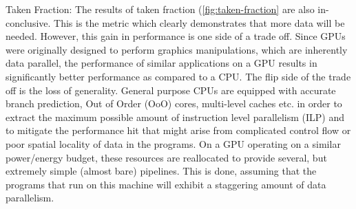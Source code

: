 \par{Taken Fraction: The results of taken fraction (\ref{fig:taken-fraction} are also in-conclusive. This is the metric which clearly demonstrates that more data will be needed. 
	However, this gain in performance is one side of a trade off. Since GPUs were originally designed to perform graphics manipulations, which are inherently data parallel, the performance of similar applications on a GPU results in significantly better performance as compared to a CPU. The flip side of the trade off is the loss of generality. General purpose CPUs are equipped with accurate branch prediction, Out of Order (OoO) cores, multi-level caches etc. in order to extract the maximum possible amount of instruction level parallelism (ILP) and to mitigate the performance hit that might arise from complicated control flow or poor spatial locality of data in the programs. On a GPU operating on a similar power/energy budget, these resources are reallocated to provide several, but extremely simple (almost bare) pipelines. This is done, assuming that the programs that run on this machine will exhibit a staggering amount of data parallelism.
}
